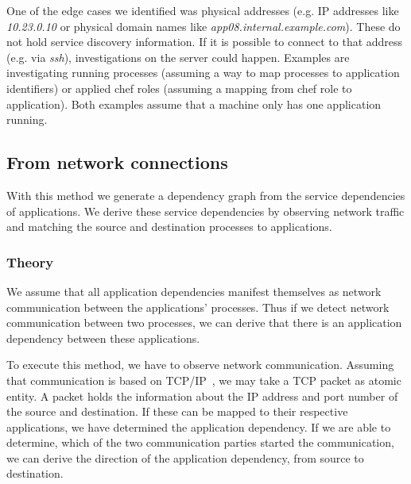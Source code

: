 
One of the edge cases we identified was physical addresses (e.g. IP addresses like  \emph{10.23.0.10} or physical domain names like \emph{app08.internal.example.com}). These do not hold service discovery information. If it is possible to connect to that address (e.g. via \emph{ssh}), investigations on the server could happen. Examples are investigating running processes (assuming a way to map processes to application identifiers) or applied chef roles (assuming a mapping from chef role to application). Both examples assume that a machine only has one application running.

\subsection{From network connections}
\label{subsec:from_network}

With this method we generate a dependency graph from the service dependencies of applications. We derive these service dependencies by observing network traffic and matching the source and destination processes to applications.

\subsubsection{Theory}

We assume that all application dependencies manifest themselves as network communication between the applications' processes. Thus if we detect network communication between two processes, we can derive that there is an application dependency between these applications.

To execute this method, we have to observe network communication. Assuming that communication is based on TCP/IP~\cite{internetprotocol}, we may take a TCP packet as atomic entity. A packet holds the information about the IP address and port number of the source and destination. If these can be mapped to their respective applications, we have determined the application dependency. If we are able to determine, which of the two communication parties started the communication, we can derive the direction of the application dependency, from source to destination.

